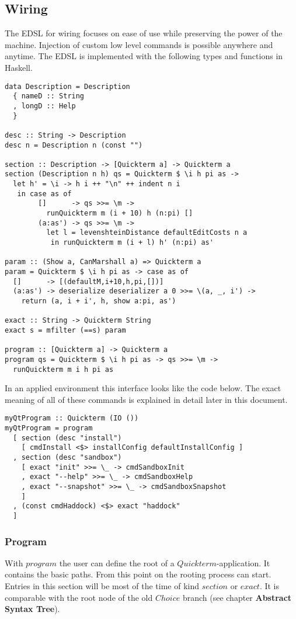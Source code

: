 \documentclass[a4paper]{article}
\begin{document}
\subsection{Wiring}
The EDSL for wiring focuses on ease of use while preserving the power of the machine. Injection of custom low level commands is possible anywhere and anytime. The EDSL is implemented with the following types and functions in Haskell.

\begin{lstlisting}
data Description = Description
  { nameD :: String
  , longD :: Help
  }

desc :: String -> Description
desc n = Description n (const "")

section :: Description -> [Quickterm a] -> Quickterm a
section (Description n h) qs = Quickterm $ \i h pi as ->
  let h' = \i -> h i ++ "\n" ++ indent n i
   in case as of
        []      -> qs >>= \m ->
          runQuickterm m (i + 10) h (n:pi) []
        (a:as') -> qs >>= \m ->
          let l = levenshteinDistance defaultEditCosts n a
           in runQuickterm m (i + l) h' (n:pi) as'

param :: (Show a, CanMarshall a) => Quickterm a
param = Quickterm $ \i h pi as -> case as of
  []      -> [(defaultM,i+10,h,pi,[])]
  (a:as') -> deserialize deserializer a 0 >>= \(a, _, i') ->
    return (a, i + i', h, show a:pi, as')

exact :: String -> Quickterm String
exact s = mfilter (==s) param

program :: [Quickterm a] -> Quickterm a
program qs = Quickterm $ \i h pi as -> qs >>= \m ->
  runQuickterm m i h pi as
\end{lstlisting}

In an applied environment this interface looks like the code below. The exact meaning of all of these commands is explained in detail later in this document.

\begin{lstlisting}
myQtProgram :: Quickterm (IO ())
myQtProgram = program
  [ section (desc "install")
    [ cmdInstall <$> installConfig defaultInstallConfig ]
  , section (desc "sandbox")
    [ exact "init" >>= \_ -> cmdSandboxInit
    , exact "--help" >>= \_ -> cmdSandboxHelp
    , exact "--snapshot" >>= \_ -> cmdSandboxSnapshot
    ]
  , (const cmdHaddock) <$> exact "haddock"
  ]
\end{lstlisting}

\subsubsection{Program}
With $program$ the user can define the root of a $Quickterm$-application. It contains the basic paths. From this point on the rooting process can start. Entries in this section will be most of the time of kind $section$ or $exact$. It is comparable with the root node of the old $Choice$ branch (see chapter \textbf{Abstract Syntax Tree}).
\end{document}
